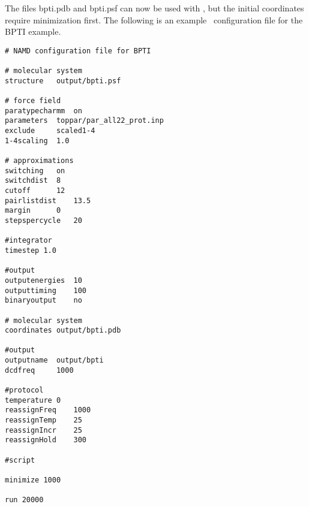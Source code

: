 The files bpti.pdb and bpti.psf can now be used with \NAMD, but the
initial coordinates require minimization first.
The following is an example \NAMD\ configuration file for the BPTI example.

\newpage
\begin{verbatim}
# NAMD configuration file for BPTI

# molecular system
structure	output/bpti.psf

# force field
paratypecharmm	on
parameters	toppar/par_all22_prot.inp
exclude		scaled1-4
1-4scaling	1.0

# approximations
switching	on
switchdist	8
cutoff		12
pairlistdist	13.5
margin		0
stepspercycle	20

#integrator
timestep 1.0

#output
outputenergies	10
outputtiming	100
binaryoutput	no

# molecular system
coordinates	output/bpti.pdb

#output
outputname	output/bpti
dcdfreq		1000

#protocol
temperature	0
reassignFreq	1000
reassignTemp	25
reassignIncr	25
reassignHold	300

#script

minimize 1000

run 20000
\end{verbatim}

